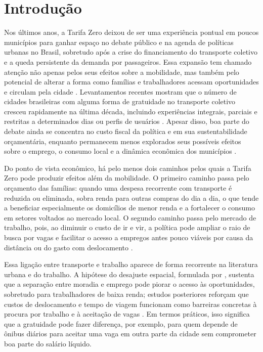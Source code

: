 \documentclass[12pt, a4paper]{article}
\begin{document}
\newpage

\section{Introdução}
Nos últimos anos, a Tarifa Zero deixou de ser uma experiência pontual em poucos municípios para ganhar espaço no debate público e na agenda de políticas urbanas no Brasil, sobretudo após a crise do financiamento do transporte coletivo e a queda persistente da demanda por passageiros.
Essa expansão tem chamado atenção não apenas pelos seus efeitos sobre a mobilidade, mas também pelo potencial de alterar a forma como famílias e trabalhadores acessam oportunidades e circulam pela cidade \citep{sartori2023}.
Levantamentos recentes mostram que o número de cidades brasileiras com alguma forma de gratuidade no transporte coletivo cresceu rapidamente na última década, incluindo experiências integrais, parciais e restritas a determinados dias ou perfis de usuários \citep{ntu2023}.
Apesar disso, boa parte do debate ainda se concentra no custo fiscal da política e em sua sustentabilidade orçamentária, enquanto permanecem menos explorados seus possíveis efeitos sobre o emprego, o consumo local e a dinâmica econômica dos municípios \citep{sampaio2024, pereiravermanderkeblowski2023}.

Do ponto de vista econômico, há pelo menos dois caminhos pelos quais a Tarifa Zero pode produzir efeitos além da mobilidade.
O primeiro caminho passa pelo orçamento das famílias: quando uma despesa recorrente com transporte é reduzida ou eliminada, sobra renda para outras compras do dia a dia, o que tende a beneficiar especialmente os domicílios de menor renda e a fortalecer o consumo em setores voltados ao mercado local.
O segundo caminho passa pelo mercado de trabalho, pois, ao diminuir o custo de ir e vir, a política pode ampliar o raio de busca por vagas e facilitar o acesso a empregos antes pouco viáveis por causa da distância ou do gasto com deslocamento \citep{kain1968, gobilonselodzenou2007, Franklin2018}.

Essa ligação entre transporte e trabalho aparece de forma recorrente na literatura urbana e do trabalho.
A hipótese do desajuste espacial, formulada por \citet{kain1968}, sustenta que a separação entre moradia e emprego pode piorar o acesso às oportunidades, sobretudo para trabalhadores de baixa renda; estudos posteriores reforçam que custos de deslocamento e tempo de viagem funcionam como barreiras concretas à procura por trabalho e à aceitação de vagas \citep{BruecknerZenou2003, zenou2009, BastiaassemJohnsonLucas2020}.
Em termos práticos, isso significa que a gratuidade pode fazer diferença, por exemplo, para quem depende de ônibus diários para aceitar uma vaga em outra parte da cidade sem comprometer boa parte do salário líquido.
\end{document}
